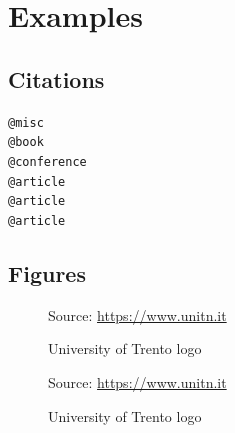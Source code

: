 \chapter{Examples}
\label{cha:examples}

\section{Citations}
\label{cha:examples_citations}

\texttt{@misc}\cite{misc} \\ %
\texttt{@book}\cite{book} \\ %
\texttt{@conference}\cite{conference} \\ %
\texttt{@article}\cite{article} \\ %
\texttt{@article}\cite{slammer_worm} \\ %
\texttt{@article}\cite{meaning_memory_safety} \\ %

\section{Figures}
\label{cha:examples_figures}

\begin{figure}[htbp]
  \centering
  \def\stackalignment{r} %
  {\scriptsize Source: \url{https://www.unitn.it} }
  \caption{University of Trento logo}
  \label{fig:unitn}
\end{figure}

\begin{figure} %
  \centering
  \def\stackalignment{r} %
  {\scriptsize \parbox[t]{\linewidth}{ Source: \url{https://www.unitn.it}} }
  \caption{University of Trento logo}
  \label{fig:unitn_wrapfigure_right}
\end{figure}

